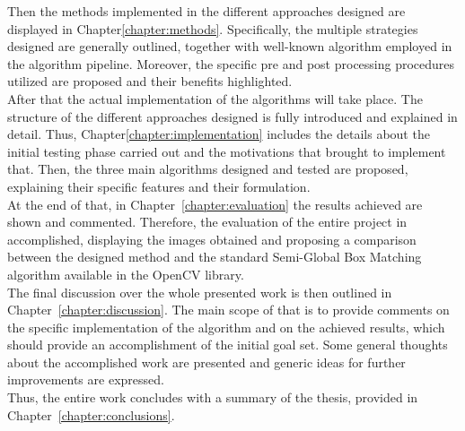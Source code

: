 Then the methods implemented in the different approaches designed are displayed in Chapter\ref{chapter:methods}. 
Specifically, the multiple strategies designed are generally outlined, together with well-known algorithm employed in the algorithm pipeline.
Moreover, the specific pre and post processing procedures utilized are proposed and their benefits highlighted. \\ 
After that the actual implementation of the algorithms will take place. 
The structure of the different approaches designed is fully introduced and explained in detail.
Thus, Chapter\ref{chapter:implementation} includes the details about the initial testing phase carried out and the motivations that brought to implement that. 
Then, the three main algorithms designed and tested are proposed, explaining their specific features and their formulation.\\
At the end of that, in Chapter~\ref{chapter:evaluation} the results achieved are shown and commented.
Therefore, the evaluation of the entire project in accomplished, displaying the images obtained and proposing a comparison between the designed method and the standard Semi-Global Box Matching algorithm available in the OpenCV library. \\
The final discussion over the whole presented work is then outlined in Chapter~\ref{chapter:discussion}.
The main scope of that is to provide comments on the specific implementation of the algorithm and on the achieved results, which should provide an accomplishment of the initial goal set.
Some general thoughts about the accomplished work are presented and generic ideas for further improvements are expressed.\\
Thus, the entire work concludes with a summary of the thesis, provided in Chapter~\ref{chapter:conclusions}.


